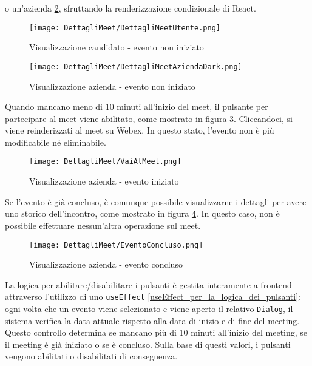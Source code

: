 o un'azienda \ref{visualizzazione_azienda_evento_non_iniziato}, sfruttando la renderizzazione condizionale di React. 
\cite{reactConditionalRendering}
\begin{figure}[H]
    \centering
    \texttt{[image: DettagliMeet/DettagliMeetUtente.png]}
    \caption{Visualizzazione candidato - evento non iniziato}
    \label{visualizzazione_candidato_evento_non_iniziato}
\end{figure}
\begin{figure}[H]
    \centering
    \texttt{[image: DettagliMeet/DettagliMeetAziendaDark.png]}
    \caption{Visualizzazione azienda - evento non iniziato}
    \label{visualizzazione_azienda_evento_non_iniziato}
\end{figure}
\noindent Quando mancano meno di 10 minuti all'inizio del meet, il pulsante per partecipare 
al meet viene abilitato, come mostrato in figura \ref{visualizzazione_azienda_evento_iniziato}. 
Cliccandoci, si viene reinderizzati al meet su Webex.
In questo stato, l'evento non è più modificabile né eliminabile.
\begin{figure}[H]
    \centering
    \texttt{[image: DettagliMeet/VaiAlMeet.png]}
    \caption{Visualizzazione azienda - evento iniziato}
    \label{visualizzazione_azienda_evento_iniziato}
\end{figure}
\noindent Se l'evento è già concluso, è comunque possibile visualizzarne i dettagli 
per avere uno storico dell'incontro, come mostrato in figura \ref{visualizzazione_azienda_evento_concluso}. 
In questo caso, non è possibile effettuare nessun'altra operazione sul meet.
\begin{figure}[H]
    \centering
    \texttt{[image: DettagliMeet/EventoConcluso.png]}
    \caption{Visualizzazione azienda - evento concluso}
    \label{visualizzazione_azienda_evento_concluso}
\end{figure}
\noindent La logica per abilitare/disabilitare i pulsanti è gestita interamente a frontend 
attraverso l'utilizzo di uno \texttt{useEffect} \ref{useEffect_per_la_logica_dei_pulsanti}: ogni volta che un evento viene selezionato
e viene aperto il relativo \texttt{Dialog}, il sistema verifica la data attuale 
rispetto alla data di inizio e di fine del meeting. Questo controllo determina se mancano più di 10 
minuti all'inizio del meeting, se il meeting è già iniziato o se è concluso. Sulla base di questi valori, 
i pulsanti vengono abilitati o disabilitati di conseguenza.
\\ 
